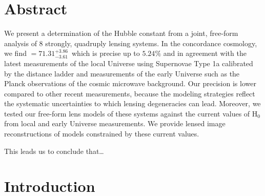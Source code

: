 
\publishedin[Reference:\\]{}
\clearpage

\section*{Abstract}
  \noindent We present a determination of the Hubble constant from a joint,
  free-form analysis of 8 strongly, quadruply lensing systems.  In the
  concordance cosmology, we find {\Ho{}$ = 71.31^{+3.86}_{-3.61}$\,\Hunits{}}
  which is precise up to $5.24\%$ and in agreement with the latest measurements
  of the local Universe using Supernovae Type 1a calibrated by the distance
  ladder and measurements of the early Universe such as the Planck observations
  of the cosmic microwave background.  Our precision is lower compared to other
  recent measurements, because the modeling strategies reflect the systematic
  uncertainties to which lensing degeneracies can lead.  Moreover, we tested our
  free-form lens models of these systems against the current values of H$_{0}$
  from local and early Universe measurements.  We provide lensed image
  reconstructions of models constrained by these current values.
  
  This leads us to conclude that\dots


\clearpage
\section{Introduction}